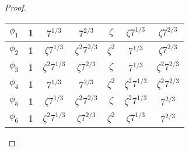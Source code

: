 \documentclass[12pt, psamsfonts]{amsart}
\theoremstyle{definition}
\theoremstyle{remark}
\numberwithin{equation}{section}
\begin{document}
\begin{proof}
\begin{enumerate}
\begin{center}
\begin{tabular}{ |c|c|c|c|c|c|c| }
            \hline $\phi_1$     & 1 & $7^{1/3}$         & $7^{2/3}$         & $\zeta$   & $\zeta 7^{1/3}$   & $\zeta 7^{2/3}$ \\
            \hline $\phi_2$     & 1 & $\zeta 7^{1/3}$   & $\zeta^2 7^{2/3}$ & $\zeta^2$ & $7^{1/3}$        & $\zeta 7^{2/3}$ \\
            \hline $\phi_3$     & 1 & $\zeta^2 7^{1/3}$ & $\zeta 7^{2/3}$   & $\zeta$   & $7^{1/3}$        & $\zeta^2 7^{2/3}$ \\
            \hline $\phi_4$     & 1 & $7^{1/3}$         & $7^{2/3}$         & $\zeta^2$ & $\zeta^2 7^{1/3}$ & $\zeta^2 7^{2/3}$ \\
            \hline $\phi_5$     & 1 & $\zeta 7^{1/3}$   & $\zeta^2 7^{2/3}$ & $\zeta$   & $\zeta^2 7^{1/3}$ & $7^{2/3}$ \\
            \hline $\phi_6$     & 1 & $\zeta^2 7^{1/3}$ & $\zeta 7^{2/3}$   & $\zeta^2$ & $\zeta 7^{1/3}$   & $7^{2/3}$ \\
          \hline
        \end{tabular}
      \end{center}

  \end{enumerate}
\end{proof}
\end{document}
